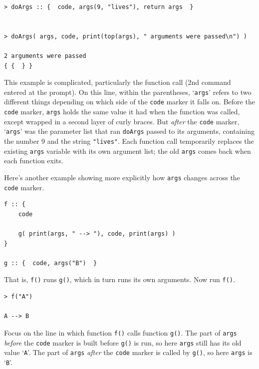 \documentclass{article}
\newenvironment{code}{
       \begin{list}{}{
               \setlength{\leftmargin}{.4in}
               \setlength{\rightmargin}{0in}
               \setlength{\topsep}{.2in}
       }
       \small
       \item[] }
       { \end{list}   }
\begin{document}
\begin{code} \begin{verbatim}
> doArgs :: {  code, args(9, "lives"), return args  }


> doArgs( args, code, print(top(args), " arguments were passed\n") )

2 arguments were passed
{ {  } }
\end{verbatim} \end{code}

\noindent This example is complicated, particularly the function call (2nd command entered at the prompt).  On this line, within the parentheses, `\texttt{args}' refers to two different things depending on which side of the \verb#code# marker it falls on.  Before the \verb#code# marker, \verb#args# holds the same value it had when the function was called, except wrapped in a second layer of curly braces.  But \emph{after} the \verb#code# marker, `\texttt{args}' was the parameter list that ran \texttt{doArgs} passed to its arguments, containing the number 9 and the string \verb#"lives"#.  Each function call temporarily replaces the existing \verb#args# variable with its own argument list; the old \verb#args# comes back when each function exits.

Here's another example showing more explicitly how \texttt{args} changes across the \texttt{code} marker.

\begin{code} \begin{verbatim}
f :: {
    code
    
    g( print(args, " --> "), code, print(args) )
}

g :: {  code, args("B")  }
\end{verbatim} \end{code}

\noindent That is, \texttt{f()} runs \texttt{g()}, which in turn runs its own arguments.  Now run \verb#f()#.

\begin{code} \begin{verbatim}
> f("A")

A --> B
\end{verbatim} \end{code}

\noindent Focus on the line in which function \verb#f()# calls function \verb#g()#.  The part of \verb#args# \emph{before} the \verb#code# marker is built before \verb#g()# is run, so here \texttt{args} still has its old value `\texttt{A}'.  The part of \verb#args# \emph{after} the \verb#code# marker is called by \texttt{g()}, so here \texttt{args} is `\texttt{B}'.
\end{document}
